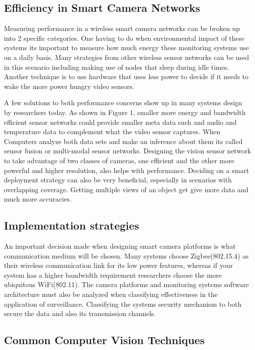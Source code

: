 \documentclass[journal,transmag]{IEEEtran}
\begin{document}
\subsection{Efficiency in Smart Camera Networks}
Measuring performance in a wireless smart camera networks can be broken up into 2 specific categories. One having to do when environmental impact of these systems its important
to measure how much energy these monitoring systems use on a daily basis. Many strategies from other wireless sensor networks can be used in this scenario including
making use of nodes that sleep during idle times. Another technique is to use hardware that uses less power to decide if it needs to wake the more power hungry video sensors.


A few solutions to both performance concerns show up in many systems design by researchers today. As shown in Figure 1, smaller more energy and bandwidth efficient sensor networks
could provide smaller meta data such and audio and temperature data to complement what the video sensor captures. When Computers analyze both data sets and
make an inference about them its called sensor fusion or multi-modal sensor networks. Designing the vision sensor network to take advantage of two classes of cameras, one 
efficient and the other more powerful and higher resolution, also helps with performance. Deciding on a smart deployment strategy can also be very beneficial,
especially in scenarios with overlapping coverage. Getting multiple views of an object get give more data and much more accuracies.

\subsection{Implementation strategies}
An important decision made when designing smart camera platforms is what communication medium will be chosen. Many systems choose Zigbee(802.15.4) as their wireless 
communication link for its low power features, whereas if your system has a higher bandwidth requirement researchers choose the more ubiquitous WiFi(802.11). The camera platforms
and monitoring systems software architecture must also be analyzed when classifying effectiveness in the application of surveillance. Classifying the systems security mechanism 
to both secure the data and also its transmission channels.  

\subsection{Common Computer Vision Techniques}
\end{document}
